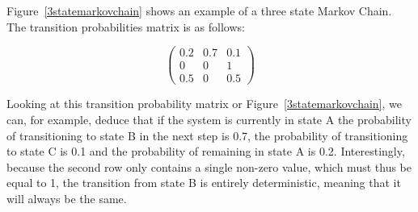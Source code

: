 Figure~\ref{3statemarkovchain} shows an example of a three state Markov Chain. The transition probabilities matrix is as follows:

\[
 \begin{pmatrix}
  0.2 & 0.7 & 0.1 \\
  0 & 0 & 1 \\
  0.5 & 0 & 0.5
 \end{pmatrix}
\]

Looking at this transition probability matrix or Figure~\ref{3statemarkovchain}, we can, for example, deduce that if the system is currently in state A the probability of transitioning to state B in the next step is 0.7, the probability of transitioning to state C is 0.1 and the probability of remaining in state A is 0.2. Interestingly, because the second row only contains a single non-zero value, which must thus be equal to 1, the transition from state B is entirely deterministic, meaning that it will always be the same.




